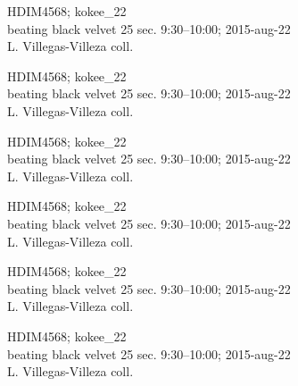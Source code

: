 \documentclass[2pt]{extarticle}
\begin{document}
\noindent
\parbox{0.16\textwidth}{\tiny \raggedright \rule[-0.3\baselineskip]{0pt}{10pt}HDIM4568; kokee\_22\\ beating black velvet 25 sec. 9:30--10:00; 2015-aug-22\\ L. Villegas-Villeza coll.}
\parbox{0.16\textwidth}{\tiny \raggedright \rule[-0.3\baselineskip]{0pt}{10pt}HDIM4568; kokee\_22\\ beating black velvet 25 sec. 9:30--10:00; 2015-aug-22\\ L. Villegas-Villeza coll.}
\parbox{0.16\textwidth}{\tiny \raggedright \rule[-0.3\baselineskip]{0pt}{10pt}HDIM4568; kokee\_22\\ beating black velvet 25 sec. 9:30--10:00; 2015-aug-22\\ L. Villegas-Villeza coll.}
\parbox{0.16\textwidth}{\tiny \raggedright \rule[-0.3\baselineskip]{0pt}{10pt}HDIM4568; kokee\_22\\ beating black velvet 25 sec. 9:30--10:00; 2015-aug-22\\ L. Villegas-Villeza coll.}
\parbox{0.16\textwidth}{\tiny \raggedright \rule[-0.3\baselineskip]{0pt}{10pt}HDIM4568; kokee\_22\\ beating black velvet 25 sec. 9:30--10:00; 2015-aug-22\\ L. Villegas-Villeza coll.}
\parbox{0.16\textwidth}{\tiny \raggedright \rule[-0.3\baselineskip]{0pt}{10pt}HDIM4568; kokee\_22\\ beating black velvet 25 sec. 9:30--10:00; 2015-aug-22\\ L. Villegas-Villeza coll.} \\ 
\vspace{0.001in} 
\end{document}
